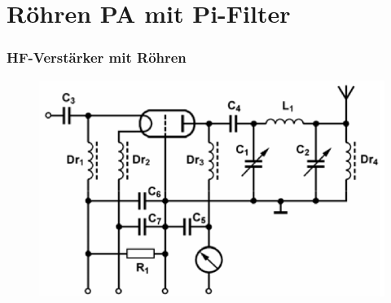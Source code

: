 

\subtitle{Technik A17: \\
  Schaltungstechnik \\[2em]}
\date{Stand 29.06.2017}


\section*{Röhren PA mit Pi-Filter}
\begin{frame}
  \frametitle{HF-Verstärker mit Röhren}
  \begin{center}
    \begin{figure}
      \includegraphics[width=1\textwidth,height=.75\textheight,keepaspectratio]{a17/TG313.png}
    \end{figure}
  \end{center}
\end{frame}

